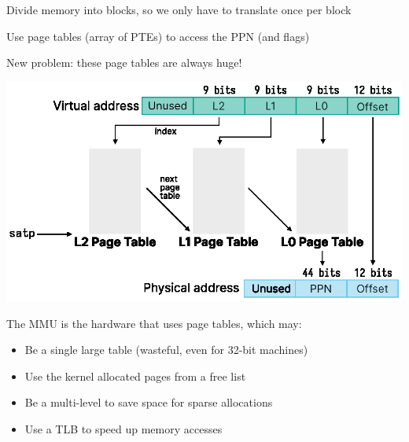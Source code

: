   \begin{slide}


    Divide memory into blocks, so we only have to translate once per block
    \medskip

    Use page tables (array of PTEs) to access the PPN (and flags)
    \medskip

    New problem: these page tables are always huge!

  \end{slide}

  \begin{slide}


    \centering
    \includegraphics{../12-page-tables/multi-level-page-table.eps}

  \end{slide}

  \begin{slide}


    The MMU is the hardware that uses page tables, which may:

    \begin{itemize}
      \item Be a single large table (wasteful, even for 32-bit machines)
      \item Use the kernel allocated pages from a free list
      \item Be a multi-level to save space for sparse allocations
      \item Use a TLB to speed up memory accesses
    \end{itemize}

  \end{slide}

